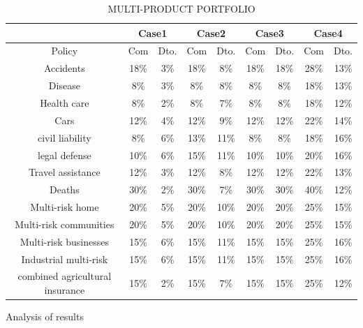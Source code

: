 \documentclass[review]{elsarticle}
\begin{document}
\begin{table}[htb]
\centering
\caption{MULTI-PRODUCT PORTFOLIO}
\label{tab:c1}
\begin{tabular}{c c c c c c c c c}
        \hline
        \hline
        & \multicolumn{2}{c}{Case1} & \multicolumn{2}{c}{Case2} & \multicolumn{2}{c}{Case3} & \multicolumn{2}{c}{Case4} \\ 
        \hline
        Policy & Com & Dto. & Com & Dto. & Com & Dto. & Com & Dto.\\
        \hline
        Accidents & 18\% & 3\% & 18\% & 8\% & 18\% & 18\% & 28\% & 13\% \\
        \hline
        Disease & 8\% & 3\% & 8\% & 8\% & 8\% & 8\% & 18\% & 13\% \\
        \hline 
        Health care & 8\% & 2\% & 8\% & 7\% & 8\% & 8\% & 18\% & 12\% \\
        \hline
         Cars & 12\% & 4\% & 12\% & 9\% & 12\% & 12\% & 22\% & 14\% \\
        \hline
         civil liability & 8\% & 6\% & 13\% & 11\% & 8\% & 8\% & 18\% & 16\% \\
        \hline
        legal defense & 10\% & 6\% & 15\% & 11\% & 10\% & 10\% & 20\% & 16\% \\
        \hline
         Travel assistance & 12\% & 3\% & 12\% & 8\% & 12\% & 12\% & 22\% & 13\% \\
        \hline
         Deaths & 30\% & 2\% & 30\% & 7\% & 30\% & 30\% & 40\% & 12\% \\
        \hline
         Multi-risk home & 20\% & 5\% & 20\% & 10\% & 20\% & 20\% & 25\% & 15\% \\
        \hline
         Multi-risk communities & 20\% & 5\% & 20\% & 10\% & 20\% & 20\% & 25\% & 15\% \\
        \hline
         Multi-risk businesses & 15\% & 6\% & 15\% & 11\% & 15\% & 15\% & 25\% & 16\% \\
        \hline
         Industrial multi-risk & 15\% & 6\% & 15\% & 11\% & 15\% & 15\% & 25\% & 16\% \\
        \hline
         combined agricultural insurance & 15\% & 2\% & 15\% & 7\% & 15\% & 15\% & 25\% & 12\% \\
        \hline
\end{tabular}
\end{table}

Analysis of results
\end{document}
